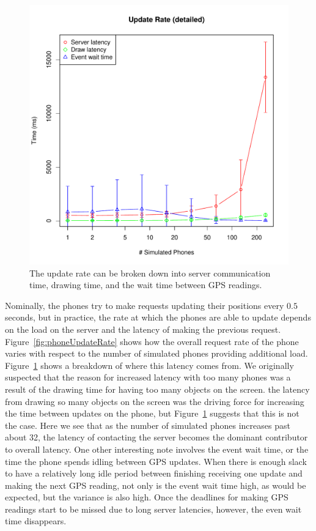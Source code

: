 \documentclass{acm_proc_article-sp}
\begin{document}
\begin{figure}
\centering
\includegraphics[scale=0.5]{figs/phoneUpdateRateDetailed}
\caption{The update rate can be broken down into server communication time, drawing time, and the wait time between GPS readings.}
\label{fig:phoneUpdateRateDetailed}
\end{figure}

Nominally, the phones try to make requests updating their positions every $0.5$ seconds, but in practice, the rate at which the phones are able to update depends on the load on the server and the latency of making the previous request. Figure~\ref{fig:phoneUpdateRate} shows how the overall request rate of the phone varies with respect to the number of simulated phones providing additional load.
Figure~\ref{fig:phoneUpdateRateDetailed} shows a breakdown of where this latency comes from. We originally suspected that the reason for increased latency with too many phones was a result of the drawing time for having too many objects on the screen. the latency from drawing so many objects on the screen was the driving force for increasing the time between updates on the phone, but Figure~\ref{fig:phoneUpdateRateDetailed} suggests that this is not the case.  Here we see that as the number of simulated phones increases past about 32, the latency of contacting the server becomes the dominant contributor to overall latency. One other interesting note involves the event wait time, or the time the phone spends idling between GPS updates.  When there is enough slack to have a relatively long idle period between finishing receiving one update and making the next GPS reading, not only is the event wait time high, as would be expected, but the variance is also high. Once the deadlines for making GPS readings start to be missed due to long server latencies, however, the even wait time disappears.
\end{document}
